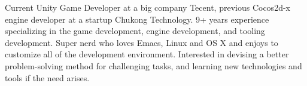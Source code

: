 

\begin{cvparagraph}

Current Unity Game Developer at a big company Tecent, previous Cocos2d-x engine developer at a startup Chukong Technology. 9+ years experience
specializing in the game development, engine development, and tooling
development. Super nerd who loves Emacs, Linux and OS X and enjoys to customize
all of the development environment. Interested in devising a better
problem-solving method for challenging tasks, and learning new technologies and
tools if the need arises.
\end{cvparagraph}
